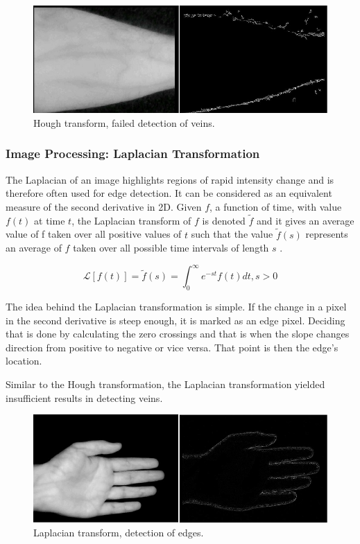 \begin{figure}[H]
\centering
\includegraphics[scale=0.7]{figures/compare7.JPG}
\caption[Hough transform, failed detection of veins]{Hough transform, failed detection of veins.}\label{fig:Compare7}
\end{figure}


\subsubsection{Image Processing: Laplacian Transformation}
The Laplacian of an image highlights regions of rapid intensity change and is therefore often used for edge detection. It can be considered as an equivalent measure of the second derivative in 2D.
Given $f$, a function of time, with value $f(t)$ at time $t$, the Laplacian transform of $f$ is denoted $\widetilde {f} $ and it gives an average value of f taken over all positive values of $t$ such
that the value $\widetilde{f}(s)$ represents an average of $f$ taken over all possible time intervals of length $s$ \parencite{laplace}.

\begin{equation}
\mathcal{L}[f(t)]= \widetilde{f} (s) = \int_{0}^{\infty} e^{-st} f(t)dt,  s >0 
\end{equation}

The idea behind the Laplacian transformation is simple. If the change in a pixel in the second derivative is steep enough, it is marked as an edge pixel. Deciding that is done by calculating the zero crossings and that is when the slope changes direction from positive to negative or vice versa. That point is then the edge's location. 

Similar to the Hough transformation, the Laplacian transformation yielded insufficient results in detecting veins.



\begin{figure}[H]
\centering
\includegraphics[scale=0.7]{figures/compare8.JPG}
\caption[Laplacian transform, detection of edges]{Laplacian transform, detection of edges.}\label{fig:Compare8}
\end{figure}

